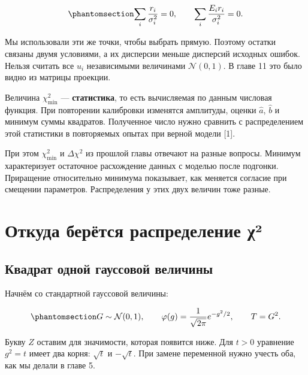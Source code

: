 \documentclass[
  russian,
  11pt,
  a4paper,
  open=any]{scrbook}
\begin{document}
\begin{equation}\protect\phantomsection\label{eq-ch13-residual-constraints}{
\sum_i\frac{r_i}{\sigma_i^2}=0,
\qquad
\sum_i\frac{E_i r_i}{\sigma_i^2}=0.
}\end{equation}

Мы использовали эти же точки, чтобы выбрать прямую. Поэтому остатки
связаны двумя условиями, а их дисперсии меньше дисперсий исходных
ошибок. Нельзя считать все \(u_i\) независимыми величинами
\(\mathcal N(0,1)\). В главе 11 это было видно из матрицы проекции.

Величина \(\chi^2_{\min}\) --- \textbf{статистика}, то есть вычисляемая
по данным числовая функция. При повторении калибровки изменятся
амплитуды, оценки \(\widehat a\), \(\widehat b\) и минимум суммы
квадратов. Полученное число нужно сравнить с распределением этой
статистики в повторяемых опытах при верной модели {[}1{]}.

При этом \(\chi^2_{\min}\) и \(\Delta\chi^2\) из прошлой главы отвечают
на разные вопросы. Минимум характеризует остаточное расхождение данных с
моделью после подгонки. Приращение относительно минимума показывает, как
меняется согласие при смещении параметров. Распределения у этих двух
величин тоже разные.

\section{Откуда берётся распределение
χ²}\label{ux43eux442ux43aux443ux434ux430-ux431ux435ux440ux451ux442ux441ux44f-ux440ux430ux441ux43fux440ux435ux434ux435ux43bux435ux43dux438ux435-ux3c7uxb2}

\subsection{Квадрат одной гауссовой
величины}\label{ux43aux432ux430ux434ux440ux430ux442-ux43eux434ux43dux43eux439-ux433ux430ux443ux441ux441ux43eux432ux43eux439-ux432ux435ux43bux438ux447ux438ux43dux44b}

Начнём со стандартной гауссовой величины:

\begin{equation}\protect\phantomsection\label{eq-ch13-squared-normal}{
G\sim\mathcal N(0,1),
\qquad
\varphi(g)=\frac{1}{\sqrt{2\pi}}e^{-g^2/2},
\qquad T=G^2.
}\end{equation}

Букву \(Z\) оставим для значимости, которая появится ниже. Для \(t>0\)
уравнение \(g^2=t\) имеет два корня: \(\sqrt t\) и \(-\sqrt t\). При
замене переменной нужно учесть оба, как мы делали в главе 5.
\end{document}
